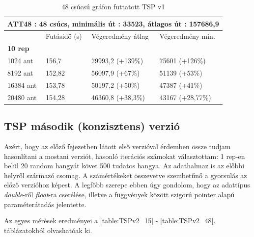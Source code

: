 \begin{table}[htbp!]
	\centering
	\begin{tabular}{|p{2cm}||p{3cm}|p{3.5cm}|p{3.5cm}|}
		\hline
		\multicolumn{4}{|c|}{ATT48 : 48 csúcs, minimális út : 33523, átlagos út : 157686,9} \\
		\hline
		& Futásidő (s) & Végeredmény átlag & Végeredmény min.\\
		\hline
		\textbf{10 rep} & & & \\
		1024 ant & 156,7 & 79993,2 (+139\%) & 75601 (+126\%) \\
		8192 ant & 152,82 & 56097,9 (+67\%) & 51139 (+53\%) \\
		16384 ant & 153,78 & 50197,2 (+50\%) & 47387 (+41\%) \\
		20480 ant & 154,28 & 46360,8 (+38,3\%) & 43167 (+28,77\%) \\
		\hline
	\end{tabular}
	\caption{48 csúcsú gráfon futtatott TSP v1}
	\label{table:TSPv1_48}
\end{table}

\newpage
\newpage

\subsection{TSP második (konzisztens) verzió}
Azért, hogy az előző fejezetben látott első verzióval érdemben össze tudjam hasonlítani a mostani verziót, hasonló iterációs számokat választottam: 1 rep-en belül 20 random hangyát követ 500 tudatos hangya. Az adathalmaz is az előbbi \cite{TSPdataset} helyről származó csomag. A számértékeket összevetve szembetűnő a gyorsulás az előző verzióhoz képest. A legfőbb szerepe ebben úgy gondolom, hogy az adattípus \textit{double}-ről \textit{float}-ra cserélése, illetve a függvények között szigorú pointer alapú paraméterátadás jelentette.

Az egyes mérések eredményei a \ref{table:TSPv2_15} - \ref{table:TSPv2_48}. táblázatokból olvashatóak ki.

